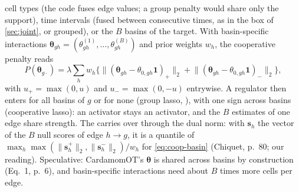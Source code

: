 \documentclass[11pt,a4paper]{article}
\begin{document}
\begin{itemize}
        cell types (the code fuses edge values; a group penalty would share only the support), time
        intervals (fused between consecutive times, as in the box of \cref{sec:joint}, or grouped), or the
        $B$ basins of the target. With basin-specific interactions $\bm\theta_{gh}=(\theta^{(1)}_{gh},\dots,
        \theta^{(B)}_{gh})$ and prior weights $w_h$, the cooperative penalty reads
        \begin{equation}\label{eq:coop-basin}
        P(\bm\theta_{g\cdot})=\lambda\sum_{h}w_h\bigl\{\lVert(\bm\theta_{gh}-\theta_{0,gh}\bm 1)_+\rVert_2
        +\lVert(\bm\theta_{gh}-\theta_{0,gh}\bm 1)_-\rVert_2\bigr\},
        \end{equation}
        with $u_+=\max(0,u)$ and $u_-=\max(0,-u)$ entrywise. A regulator then enters for all basins of $g$
        or for none (group lasso, \textcite{yuanModelSelectionEstimation2006}), with one sign across basins
        (cooperative lasso): an activator stays an activator, and the $B$ estimates of one edge share
        strength. The  carries over through the dual norm: with $\bm s_h$ the vector of the
        $B$ null scores of edge $h\to g$, it is a quantile of
        $\max_h\max(\lVert\bm s_h^+\rVert_2,\lVert\bm s_h^-\rVert_2)/w_h$ for \eqref{eq:coop-basin}
        (Chiquet, p.~80; our reading). Speculative: CardamomOT's $\bm\theta$ is shared across basins by
        construction (Eq.~1, p.~6), and basin-specific interactions need about $B$ times more cells per edge.
\end{itemize}
\end{document}
